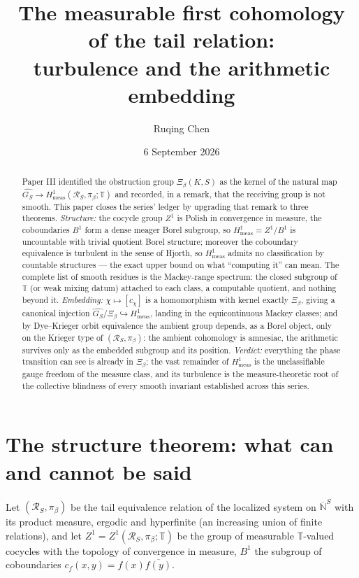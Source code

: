 \documentclass[11pt]{amsart}
\title[Measurable cohomology of the tail relation]{The measurable first cohomology of the tail relation:\\ turbulence and the arithmetic embedding}
\author{Ruqing Chen}
\date{6 September 2026}
\theoremstyle{remark}
\newcommand{\T}{\mathbb{T}}
\newcommand{\R}{\mathcal{R}}
\newcommand{\Hmeas}{H^1_{\mathrm{meas}}}
\newcommand{\GS}{\widehat{G_S}}
\begin{document}
\begin{abstract}
Paper III identified the obstruction group $\Xi_\beta(K,S)$ as the kernel of the natural
map $\GS\to\Hmeas(\R_S,\pi_\beta;\T)$ and recorded, in a remark, that the receiving group
is not smooth. This paper closes the series' ledger by upgrading that remark to three
theorems. \emph{Structure:} the cocycle group $Z^1$ is Polish in convergence in measure,
the coboundaries $B^1$ form a dense meager Borel subgroup, so $\Hmeas=Z^1/B^1$ is
uncountable with trivial quotient Borel structure; moreover the coboundary equivalence is
turbulent in the sense of Hjorth, so $\Hmeas$ admits no classification by countable
structures --- the exact upper bound on what ``computing it'' can mean. The complete list
of smooth residues is the Mackey-range spectrum: the closed subgroup of $\T$ (or weak
mixing datum) attached to each class, a computable quotient, and nothing beyond it.
\emph{Embedding:} $\chi\mapsto[c_\chi]$ is a homomorphism with kernel exactly
$\Xi_\beta$, giving a canonical injection $\GS/\Xi_\beta\hookrightarrow\Hmeas$, landing
in the equicontinuous Mackey classes; and by Dye--Krieger orbit equivalence the ambient
group depends, as a Borel object, only on the Krieger type of $(\R_S,\pi_\beta)$: the
ambient cohomology is amnesiac, the arithmetic survives only as the embedded subgroup
and its position. \emph{Verdict:} everything the phase transition can see is already in
$\Xi_\beta$; the vast remainder of $\Hmeas$ is the unclassifiable gauge freedom of the
measure class, and its turbulence is the measure-theoretic root of the collective
blindness of every smooth invariant established across this series.
\end{abstract}

\maketitle

\section{The structure theorem: what can and cannot be said}\label{sec:structure}

Let $(\R_S,\pi_\beta)$ be the tail equivalence relation of the localized system on
$\overline{\mathbb N}^S$ with its product measure, ergodic and hyperfinite (an increasing
union of finite relations), and let $Z^1=Z^1(\R_S,\pi_\beta;\T)$ be the group of
measurable $\T$-valued cocycles with the topology of convergence in measure, $B^1$ the
subgroup of coboundaries $c_f(x,y)=f(x)\overline{f(y)}$.
\end{document}
